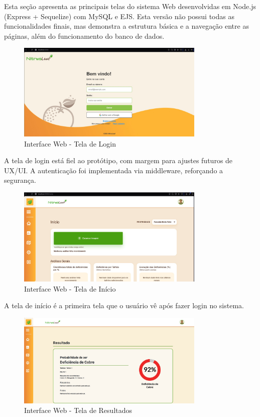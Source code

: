 Esta seção apresenta as principais telas do sistema Web desenvolvidas em Node.js
(Express + Sequelize) com MySQL e EJS. Esta versão não possui todas as funcionalidades
finais, mas demonstra a estrutura básica e a navegação entre as páginas, além do funcionamento
do banco de dados.
\medskip

\begin{figure}[H]
\centering
\caption{Interface Web - Tela de Login}
\label{fig:interface-web-tela-login}
\includegraphics[width=0.8\textwidth]{Images/AppLogin.png}
\end{figure}

A tela de login está fiel ao protótipo, com margem para 
ajustes futuros de UX/UI. A autenticação foi implementada via middleware, 
reforçando a segurança.

\begin{figure}[H]
\centering
\caption{Interface Web - Tela de Início}
\label{fig:interface-web-tela-inicio}
\includegraphics[width=0.8\textwidth]{Images/AppInicio.jpeg}
\end{figure}

A tela de início é a primeira tela que o usuário vê após fazer login no sistema. 

\medskip

\begin{figure}[H]
\centering
\caption{Interface Web - Tela de Resultados}
\label{fig:interface-web-tela-resultados}
\includegraphics[width=0.8\textwidth]{Images/AppResultado.jpeg}
\end{figure}

